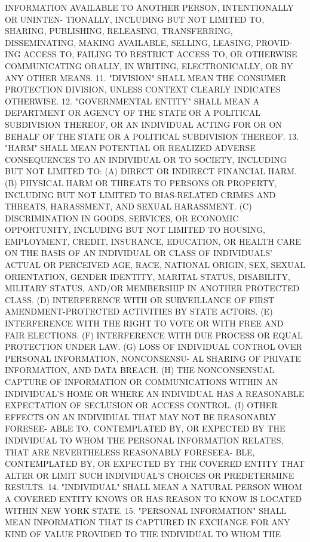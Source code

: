  INFORMATION AVAILABLE  TO  ANOTHER  PERSON,  INTENTIONALLY  OR  UNINTEN-
 TIONALLY,  INCLUDING BUT NOT LIMITED TO, SHARING, PUBLISHING, RELEASING,
 TRANSFERRING, DISSEMINATING, MAKING AVAILABLE, SELLING, LEASING, PROVID-
 ING ACCESS TO, FAILING TO RESTRICT ACCESS TO, OR OTHERWISE COMMUNICATING
 ORALLY, IN WRITING, ELECTRONICALLY, OR BY ANY OTHER MEANS.
   11.  "DIVISION"  SHALL  MEAN  THE CONSUMER PROTECTION DIVISION, UNLESS
 CONTEXT CLEARLY INDICATES OTHERWISE.
   12. "GOVERNMENTAL ENTITY" SHALL MEAN A DEPARTMENT  OR  AGENCY  OF  THE
 STATE OR A POLITICAL SUBDIVISION THEREOF, OR AN INDIVIDUAL ACTING FOR OR
 ON BEHALF OF THE STATE OR A POLITICAL SUBDIVISION THEREOF.
   13. "HARM" SHALL MEAN POTENTIAL OR REALIZED ADVERSE CONSEQUENCES TO AN
 INDIVIDUAL OR TO SOCIETY, INCLUDING BUT NOT LIMITED TO:
   (A) DIRECT OR INDIRECT FINANCIAL HARM.
   (B) PHYSICAL HARM OR THREATS TO PERSONS OR PROPERTY, INCLUDING BUT NOT
 LIMITED  TO  BIAS-RELATED  CRIMES  AND  THREATS,  HARASSMENT, AND SEXUAL
 HARASSMENT.
   (C)  DISCRIMINATION  IN  GOODS,  SERVICES,  OR  ECONOMIC  OPPORTUNITY,
 INCLUDING  BUT  NOT  LIMITED  TO HOUSING, EMPLOYMENT, CREDIT, INSURANCE,
 EDUCATION, OR HEALTH CARE ON THE BASIS OF  AN  INDIVIDUAL  OR  CLASS  OF
 INDIVIDUALS' ACTUAL OR PERCEIVED AGE, RACE, NATIONAL ORIGIN, SEX, SEXUAL
 ORIENTATION,  GENDER  IDENTITY,  MARITAL  STATUS,  DISABILITY,  MILITARY
 STATUS, AND/OR MEMBERSHIP IN ANOTHER PROTECTED CLASS.
   (D) INTERFERENCE WITH OR  SURVEILLANCE  OF  FIRST  AMENDMENT-PROTECTED
 ACTIVITIES BY STATE ACTORS.
   (E)  INTERFERENCE  WITH  THE  RIGHT  TO  VOTE  OR  WITH  FREE AND FAIR
 ELECTIONS.
   (F) INTERFERENCE WITH DUE PROCESS OR EQUAL PROTECTION UNDER LAW.
   (G) LOSS OF INDIVIDUAL CONTROL OVER PERSONAL INFORMATION, NONCONSENSU-
 AL SHARING OF PRIVATE INFORMATION, AND DATA BREACH.
   (H) THE NONCONSENSUAL CAPTURE OF INFORMATION OR COMMUNICATIONS  WITHIN
 AN INDIVIDUAL'S HOME OR WHERE AN INDIVIDUAL HAS A REASONABLE EXPECTATION
 OF SECLUSION OR ACCESS CONTROL.
   (I) OTHER EFFECTS ON AN INDIVIDUAL THAT MAY NOT BE REASONABLY FORESEE-
 ABLE  TO,  CONTEMPLATED  BY,  OR  EXPECTED BY THE INDIVIDUAL TO WHOM THE
 PERSONAL INFORMATION RELATES, THAT ARE NEVERTHELESS REASONABLY FORESEEA-
 BLE, CONTEMPLATED BY, OR EXPECTED BY THE COVERED ENTITY  THAT  ALTER  OR
 LIMIT SUCH INDIVIDUAL'S CHOICES OR PREDETERMINE RESULTS.
   14.  "INDIVIDUAL"  SHALL  MEAN  A NATURAL PERSON WHOM A COVERED ENTITY
 KNOWS OR HAS REASON TO KNOW IS LOCATED WITHIN NEW YORK STATE.
   15. "PERSONAL INFORMATION" SHALL MEAN INFORMATION THAT IS CAPTURED  IN
 EXCHANGE  FOR  ANY  KIND OF VALUE PROVIDED TO THE INDIVIDUAL TO WHOM THE
